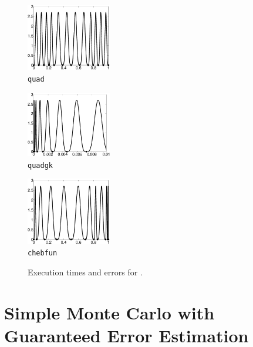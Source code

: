 \documentclass[graybox]{svmult}
\begin{document}
\begin{figure}
\centering
\begin{minipage}{3.7cm} \centering \includegraphics[width=3.7cm]{Foolquadbw.eps} \\ {\tt quad} \end{minipage}
\begin{minipage}{3.7cm} \centering \includegraphics[width=3.7cm]{Foolquadgkbw.eps} \\ {\tt quadgk} \end{minipage}
\begin{minipage}{3.7cm} \centering \includegraphics[width=3.7cm]{Foolchebintbw.eps} \\ {\tt chebfun} \end{minipage}
\caption{Execution times and errors for . \label{OneDGaussErrfig}}
\end{figure}



\section{Simple Monte Carlo with Guaranteed Error Estimation}
\end{document}
